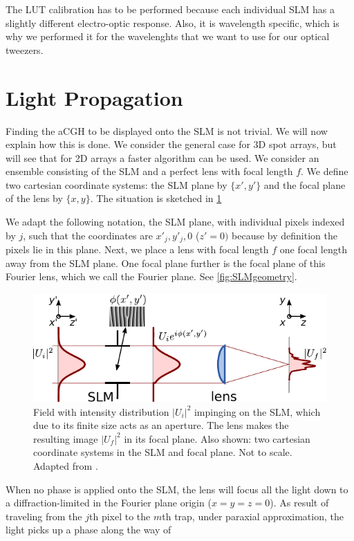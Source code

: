 The LUT calibration has to be performed because each individual SLM has a slightly different electro-optic response. 
Also, it is wavelength specific, which is why we performed it for the wavelenghts that we want to use for our optical tweezers. 

\section{Light Propagation}\label{sec:PropagationDerivation}

Finding the a\ac{CGH} to be displayed onto the SLM is not trivial. We will now explain how this is done.
We consider the general case for 3D spot arrays, but will see that for 2D arrays a faster algorithm can be used. 
We consider an ensemble consisting of the SLM and a perfect lens with focal length $f$. We define two cartesian coordinate systems: the SLM plane by $\{x',y'\}$ and the focal plane of the lens by $\{x,y\}$. 
The situation is sketched in \cref{fig:SLMLens}

We adapt the following notation, the \ac{SLM} plane, with individual pixels indexed by $j$, such that the coordinates are $x'_j, y'_j,0$ ($z'=0)$ because by definition the pixels lie in this plane.
Next, we place a lens with focal length $f$ one focal length away from the SLM plane.
One focal plane further is the focal plane of this Fourier lens, which we call the Fourier plane. See \cref{fig:SLMgeometry}. 

\begin{figure}
    \centering
    \includegraphics[width = 12cm]{figures/SLMfigure.pdf}
    \caption{Field with intensity distribution $|U_i|^2$ impinging on the SLM, which due to its finite size acts as an aperture.
    The lens makes the resulting image $|U_f|^2$ in its focal plane.
    Also shown: two cartesian coordinate systems in the SLM and focal plane. 
    Not to scale. 
    Adapted from \cite{Labuhn2016}.}
    \label{fig:SLMLens}
\end{figure}

When no phase is applied onto the SLM, the lens will focus all the light down to a diffraction-limited in the Fourier plane origin ($x=y=z=0$).
As result of traveling from the $j$th pixel to the $m$th trap, under paraxial approximation, the light picks up a phase along the way of 


